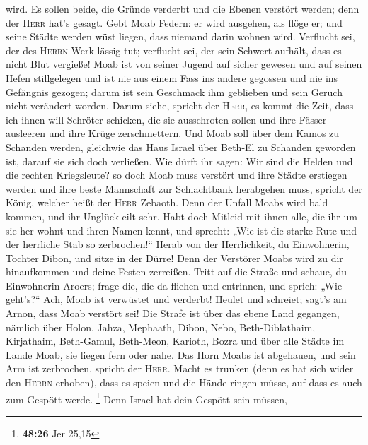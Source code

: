 wird. Es sollen beide, die Gründe verderbt und die Ebenen verstört
werden; denn der \textsc{Herr} hat's gesagt.  Gebt Moab
Federn: er wird ausgehen, als flöge er; und seine Städte werden wüst
liegen, dass niemand darin wohnen wird.  Verflucht sei,
der des \textsc{Herrn} Werk lässig tut; verflucht sei, der sein Schwert
aufhält, dass es nicht Blut vergieße!  Moab ist von
seiner Jugend auf sicher gewesen und auf seinen Hefen stillgelegen und
ist nie aus einem Fass ins andere gegossen und nie ins Gefängnis
gezogen; darum ist sein Geschmack ihm geblieben und sein Geruch nicht
verändert worden.  Darum siehe, spricht der
\textsc{Herr}, es kommt die Zeit, dass ich ihnen will Schröter schicken,
die sie ausschroten sollen und ihre Fässer ausleeren und ihre Krüge
zerschmettern.  Und Moab soll über dem Kamos zu Schanden
werden, gleichwie das Haus Israel über Beth-El zu Schanden geworden ist,
darauf sie sich doch verließen.  Wie dürft ihr sagen: Wir
sind die Helden und die rechten Kriegsleute?  so doch
Moab muss verstört und ihre Städte erstiegen werden und ihre beste
Mannschaft zur Schlachtbank herabgehen muss, spricht der König, welcher
heißt der \textsc{Herr} Zebaoth.  Denn der Unfall Moabs
wird bald kommen, und ihr Unglück eilt sehr.  Habt doch
Mitleid mit ihnen alle, die ihr um sie her wohnt und ihren Namen kennt,
und sprecht: „Wie ist die starke Rute und der herrliche Stab so
zerbrochen!{}``  Herab von der Herrlichkeit, du
Einwohnerin, Tochter Dibon, und sitze in der Dürre! Denn der Verstörer
Moabs wird zu dir hinaufkommen und deine Festen zerreißen.
 Tritt auf die Straße und schaue, du Einwohnerin Aroers;
frage die, die da fliehen und entrinnen, und sprich: „Wie geht's?{}``
 Ach, Moab ist verwüstet und verderbt! Heulet und
schreiet; sagt's am Arnon, dass Moab verstört sei!  Die
Strafe ist über das ebene Land gegangen, nämlich über Holon, Jahza,
Mephaath,  Dibon, Nebo, Beth-Diblathaim, 
Kirjathaim, Beth-Gamul, Beth-Meon,  Karioth, Bozra und
über alle Städte im Lande Moab, sie liegen fern oder nahe.
 Das Horn Moabs ist abgehauen, und sein Arm ist
zerbrochen, spricht der \textsc{Herr}.  Macht es trunken
(denn es hat sich wider den \textsc{Herrn} erhoben), dass es speien und
die Hände ringen müsse, auf dass es auch zum Gespött werde. \footnote{\textbf{48:26}
  Jer 25,15}  Denn Israel hat dein Gespött sein müssen,
